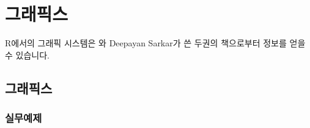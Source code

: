 \documentclass[../tutorial.tex]{subfiles}
\begin{document}
\part{그래픽스}

R에서의 그래픽 시스템은 \citet{Murrell2005}와 Deepayan Sarkar가 쓴 두권의 책으로부터 정보를 얻을 수 있습니다.


\chapter{그래픽스}


\section{실무예제}
\end{document}
